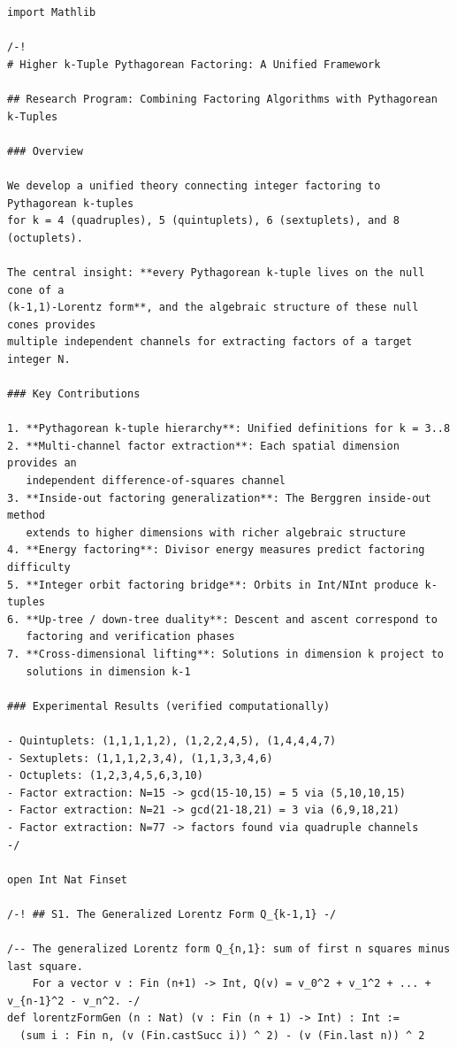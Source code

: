 \documentclass[11pt,openright,twoside]{book}
\theoremstyle{definition}
\begin{document}
\begin{lstlisting}[style=lean]
import Mathlib

/-!
# Higher k-Tuple Pythagorean Factoring: A Unified Framework

## Research Program: Combining Factoring Algorithms with Pythagorean k-Tuples

### Overview

We develop a unified theory connecting integer factoring to Pythagorean k-tuples
for k = 4 (quadruples), 5 (quintuplets), 6 (sextuplets), and 8 (octuplets).

The central insight: **every Pythagorean k-tuple lives on the null cone of a
(k-1,1)-Lorentz form**, and the algebraic structure of these null cones provides
multiple independent channels for extracting factors of a target integer N.

### Key Contributions

1. **Pythagorean k-tuple hierarchy**: Unified definitions for k = 3..8
2. **Multi-channel factor extraction**: Each spatial dimension provides an
   independent difference-of-squares channel
3. **Inside-out factoring generalization**: The Berggren inside-out method
   extends to higher dimensions with richer algebraic structure
4. **Energy factoring**: Divisor energy measures predict factoring difficulty
5. **Integer orbit factoring bridge**: Orbits in Int/NInt produce k-tuples
6. **Up-tree / down-tree duality**: Descent and ascent correspond to
   factoring and verification phases
7. **Cross-dimensional lifting**: Solutions in dimension k project to
   solutions in dimension k-1

### Experimental Results (verified computationally)

- Quintuplets: (1,1,1,1,2), (1,2,2,4,5), (1,4,4,4,7)
- Sextuplets: (1,1,1,2,3,4), (1,1,3,3,4,6)
- Octuplets: (1,2,3,4,5,6,3,10)
- Factor extraction: N=15 -> gcd(15-10,15) = 5 via (5,10,10,15)
- Factor extraction: N=21 -> gcd(21-18,21) = 3 via (6,9,18,21)
- Factor extraction: N=77 -> factors found via quadruple channels
-/

open Int Nat Finset

/-! ## S1. The Generalized Lorentz Form Q_{k-1,1} -/

/-- The generalized Lorentz form Q_{n,1}: sum of first n squares minus last square.
    For a vector v : Fin (n+1) -> Int, Q(v) = v_0^2 + v_1^2 + ... + v_{n-1}^2 - v_n^2. -/
def lorentzFormGen (n : Nat) (v : Fin (n + 1) -> Int) : Int :=
  (sum i : Fin n, (v (Fin.castSucc i)) ^ 2) - (v (Fin.last n)) ^ 2


\end{lstlisting}
\end{document}
